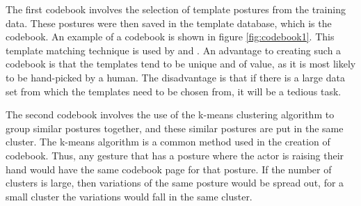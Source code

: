 \documentclass[]{report}   %
\begin{document}
The first codebook involves the selection of template postures from the training data. These postures were then saved in the template database, which is the codebook. An example of a codebook is shown in figure \ref{fig:codebook1}. This template matching technique is used by \citet{springerlink:10.1007/s00422-004-0516-0} and \citet{springerlink:10.1007/11492429_73}. An advantage to creating such a codebook is that the templates tend to be unique and of value, as it is most likely to be hand-picked by a human. The disadvantage is that if there is a large data set from which the templates need to be chosen from, it will be a tedious task.

The second codebook involves the use of the k-means clustering algorithm to group similar postures together, and these similar postures are put in the same cluster. The k-means algorithm is a common method used in the creation of codebook\cite{Yang_1994_329}. Thus, any gesture that has a posture where the actor is raising their hand would have the same codebook page for that posture. If the number of clusters is large, then variations of the same posture would be spread out, for a small cluster the variations would fall in the same cluster.
\end{document}
